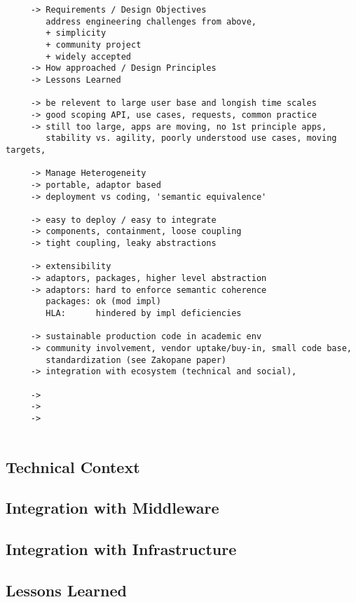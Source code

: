 \documentclass[a4paper,10pt]{article}
\begin{document}
  \begin{verbatim}
     -> Requirements / Design Objectives
        address engineering challenges from above, 
        + simplicity
        + community project
        + widely accepted
     -> How approached / Design Principles
     -> Lessons Learned
  
     -> be relevent to large user base and longish time scales
     -> good scoping API, use cases, requests, common practice
     -> still too large, apps are moving, no 1st principle apps,
        stability vs. agility, poorly understood use cases, moving targets, 

     -> Manage Heterogeneity
     -> portable, adaptor based
     -> deployment vs coding, 'semantic equivalence'
  
     -> easy to deploy / easy to integrate
     -> components, containment, loose coupling
     -> tight coupling, leaky abstractions
  
     -> extensibility
     -> adaptors, packages, higher level abstraction
     -> adaptors: hard to enforce semantic coherence
        packages: ok (mod impl)
        HLA:      hindered by impl deficiencies
  
     -> sustainable production code in academic env
     -> community involvement, vendor uptake/buy-in, small code base,
        standardization (see Zakopane paper)
     -> integration with ecosystem (technical and social), 
  
     ->
     -> 
     ->
  
  \end{verbatim}

\subsection{Technical Context}

\subsection{Integration with Middleware}

\subsection{Integration with Infrastructure}

\subsection{Lessons Learned}
\end{document}

